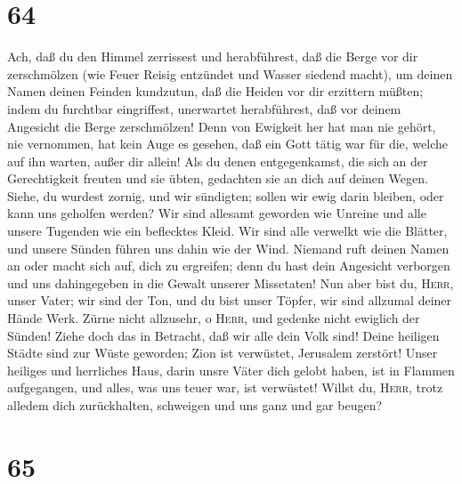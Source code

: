 \hypertarget{section-63}{%
\section{64}\label{section-63}}

 Ach, daß du den Himmel zerrissest und herabführest, daß
die Berge vor dir zerschmölzen (wie Feuer Reisig entzündet und Wasser
siedend macht),  um deinen Namen deinen Feinden kundzutun,
daß die Heiden vor dir erzittern müßten;  indem du
furchtbar eingriffest, unerwartet herabführest, daß vor deinem Angesicht
die Berge zerschmölzen!  Denn von Ewigkeit her hat man nie
gehört, nie vernommen, hat kein Auge es gesehen, daß ein Gott tätig war
für die, welche auf ihn warten, außer dir allein!  Als du
denen entgegenkamst, die sich an der Gerechtigkeit freuten und sie
übten, gedachten sie an dich auf deinen Wegen. Siehe, du wurdest zornig,
und wir sündigten; sollen wir ewig darin bleiben, oder kann uns geholfen
werden?  Wir sind allesamt geworden wie Unreine und alle
unsere Tugenden wie ein beflecktes Kleid. Wir sind alle verwelkt wie die
Blätter, und unsere Sünden führen uns dahin wie der Wind. 
Niemand ruft deinen Namen an oder macht sich auf, dich zu ergreifen;
denn du hast dein Angesicht verborgen und uns dahingegeben in die Gewalt
unserer Missetaten!  Nun aber bist du, \textsc{Herr},
unser Vater; wir sind der Ton, und du bist unser Töpfer, wir sind
allzumal deiner Hände Werk.  Zürne nicht allzusehr, o
\textsc{Herr}, und gedenke nicht ewiglich der Sünden! Ziehe doch das in
Betracht, daß wir alle dein Volk sind!  Deine heiligen
Städte sind zur Wüste geworden; Zion ist verwüstet, Jerusalem zerstört!
 Unser heiliges und herrliches Haus, darin unsre Väter
dich gelobt haben, ist in Flammen aufgegangen, und alles, was uns teuer
war, ist verwüstet!  Willst du, \textsc{Herr}, trotz
alledem dich zurückhalten, schweigen und uns ganz und gar beugen?

\hypertarget{section-64}{%
\section{65}\label{section-64}}

